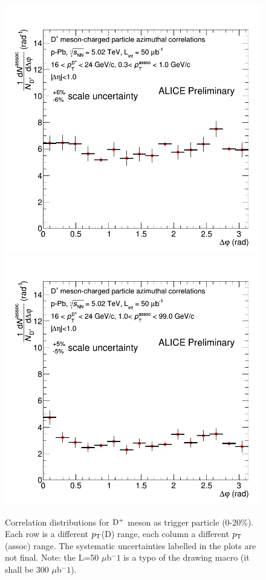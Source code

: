 \begin{figure}
{\includegraphics[width=0.32\linewidth]{figuresVsCent/Dplus/Correlations/020/CanvaAndVariedHistopPbDplusPt16to24assocPt03to1.png}}
{\includegraphics[width=0.32\linewidth]{figuresVsCent/Dplus/Correlations/020/CanvaAndVariedHistopPbDplusPt16to24assocPt1to99.png}}
 \caption{Correlation distributions for ${\rm D^+}$ meson as trigger particle (0-20\%). Each row is a different $p_{\rm T}$(D) range, each column a different $p_{\rm T}$(assoc) range. The systematic uncertainties labelled in the plots are not final. Note: the L=50 $\mu$b$^-1$ is a typo of the drawing macro (it shall be 300 $\mu$b$^-1$).}
\label{fig:Dpluscorr020}
\end{figure}

